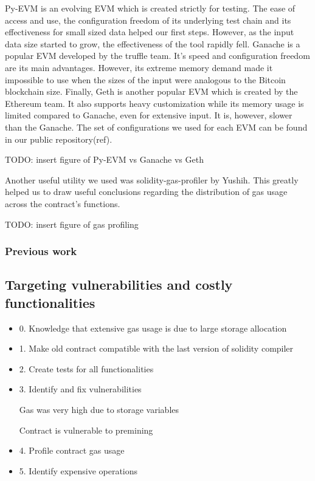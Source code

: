 \documentclass{article}
\begin{document}
  Py-EVM is an evolving EVM which is created strictly for testing. The
  ease of access and use, the configuration freedom of its underlying
  test chain and its effectiveness for small sized data helped our first
  steps. However, as the input data size started to grow, the
  effectiveness of the tool rapidly fell. Ganache is a popular EVM
  developed by the truffle team. It’s speed and configuration freedom
  are its main advantages. However, its extreme memory demand made it
  impossible to use when the sizes of the input were analogous to the
  Bitcoin blockchain size. Finally, Geth is another popular EVM which is
  created by the Ethereum team. It also supports heavy customization
  while its memory usage is limited compared to Ganache, even for
  extensive input. It is, however, slower than the Ganache. The set of
  configurations we used for each EVM can be found in our public
  repository(ref).

  TODO: insert figure of Py-EVM vs Ganache vs Geth

  Another useful utility we used was solidity-gas-profiler by Yushih.
  This greatly helped us to draw useful conclusions regarding the
  distribution of gas usage across the contract’s functions.

  TODO: insert figure of gas profiling

  \subsubsection{Previous work}

  \subsection{Targeting vulnerabilities and costly functionalities}

  \begin{itemize}
  \item
    0. Knowledge that extensive gas usage is due to large storage
    allocation
  \item
    1. Make old contract compatible with the last version of solidity
    compiler
  \item
    2. Create tests for all functionalities
  \item
    3. Identify and fix vulnerabilities

    Gas was very high due to storage variables

    Contract is vulnerable to premining
  \item
    4. Profile contract gas usage
  \item
    5. Identify expensive operations
  \end{itemize}
\end{document}
